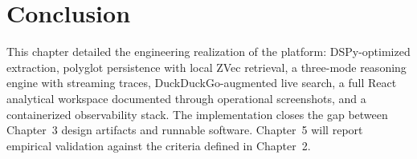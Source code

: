 \section{Conclusion}

This chapter detailed the engineering realization of the platform: DSPy-optimized extraction, polyglot persistence with local ZVec retrieval, a three-mode reasoning engine with streaming traces, DuckDuckGo-augmented live search, a full React analytical workspace documented through operational screenshots, and a containerized observability stack. The implementation closes the gap between Chapter~3 design artifacts and runnable software. Chapter~5 will report empirical validation against the criteria defined in Chapter~2.
